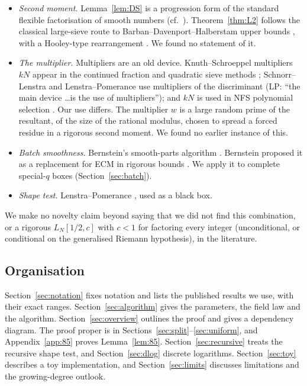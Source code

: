 \documentclass[11pt]{amsart}
\theoremstyle{definition}
\begin{document}
\begin{itemize}
  analogue for the moduli $\ell\cdot(\text{smooth})$. Its proof (Appendix~\ref{app:85}) is self-contained apart from one published lemma
  of Drappeau \cite[Lemme~5]{drappeau2015} (also Pascadi \cite[Lemma~3.2]{pascadi2025}) for characters of small conductor, and
  the classical large sieve \cite[Thm.~7.13]{ik2004}. Our one-point smoothing Lemma~\ref{lem:smooth1} replaces Lee--Venkatesan's
  Lemmas~5.13--5.20.
\item \emph{Second moment.} Lemma~\ref{lem:DS} is a progression form of the standard flexible factorisation
  of smooth numbers \cite{friedlander1981,hildebrand1985} (cf.\ \cite[Smooth Numbers Result~3]{harper2016}). Theorem~\ref{thm:L2} follows
  the classical large-sieve route to Barban--Davenport--Halberstam upper bounds \cite{gallagher1967,montgomery1970}, with a
  Hooley-type rearrangement \cite{hooley1975}. We found no statement of it.
\item \emph{The multiplier.} Multipliers are an old device. Knuth--Schroeppel multipliers $kN$ appear in the continued fraction and quadratic sieve methods
  \cite{morrisonbrillhart1975}; Schnorr--Lenstra \cite{schnorrlenstra1984} and Lenstra--Pomerance \cite{lp1992} use multipliers of the
  discriminant (LP: ``the main device \ldots is the use of multipliers''); and $kN$ is used in NFS
  polynomial selection \cite{murphy1999}. Our use differs. The multiplier $w$ is a large random
  prime of the resultant, of the size of the rational modulus, chosen to spread a forced residue in a rigorous second moment. We found no
  earlier instance of this.
\item \emph{Batch smoothness.} Bernstein's smooth-parts algorithm \cite{bernstein2004,bernstein2008}. Bernstein
  proposed it as a replacement for ECM in rigorous bounds \cite{bernstein2002}. We apply it to complete
  special-$q$ boxes (Section~\ref{sec:batch}).
\item \emph{Shape test.} Lenstra--Pomerance \cite{lp1992}, used as a black box.
\end{itemize}
We make no novelty claim beyond saying that we did not find this combination, or a rigorous
$L_N[1/2,c]$ with $c<1$ for factoring every integer (unconditional, or conditional on the generalised Riemann hypothesis), in the literature.

\subsection{Organisation}
Section~\ref{sec:notation} fixes notation and lists the published results we use, with their exact
ranges. Section~\ref{sec:algorithm} gives the parameters, the field law and the algorithm.
Section~\ref{sec:overview} outlines the proof and gives a dependency diagram. The proof proper is in
Sections~\ref{sec:split}--\ref{sec:uniform}, and Appendix~\ref{app:85} proves Lemma~\ref{lem:85}.
Section~\ref{sec:recursive} treats the recursive shape test, and Section~\ref{sec:dlog} discrete logarithms. Section~\ref{sec:toy} describes a toy implementation, and
Section~\ref{sec:limits} discusses limitations and the growing-degree outlook.
\end{document}
